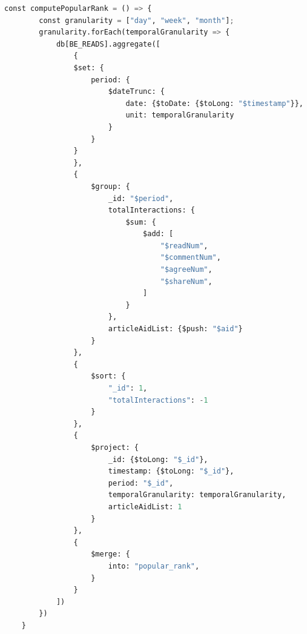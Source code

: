 \documentclass{report}
\begin{document}
    \begin{lstlisting}[language=python, caption=Aggregation pipeline for generating Popular-Rank table]
    const computePopularRank = () => {
        const granularity = ["day", "week", "month"];
        granularity.forEach(temporalGranularity => {
            db[BE_READS].aggregate([
                {
                $set: {
                    period: {
                        $dateTrunc: {
                            date: {$toDate: {$toLong: "$timestamp"}},
                            unit: temporalGranularity
                        }
                    }
                }
                },
                {
                    $group: {
                        _id: "$period",
                        totalInteractions: {
                            $sum: {
                                $add: [
                                    "$readNum",
                                    "$commentNum",
                                    "$agreeNum",
                                    "$shareNum",
                                ]
                            }
                        },
                        articleAidList: {$push: "$aid"} 
                    }
                },
                {
                    $sort: {
                        "_id": 1,
                        "totalInteractions": -1
                    }
                },
                {
                    $project: {
                        _id: {$toLong: "$_id"},
                        timestamp: {$toLong: "$_id"},
                        period: "$_id",
                        temporalGranularity: temporalGranularity,
                        articleAidList: 1 
                    }
                },
                {
                    $merge: {
                        into: "popular_rank",
                    }
                }
            ])
        })
    }
    \end{lstlisting}
\end{document}
